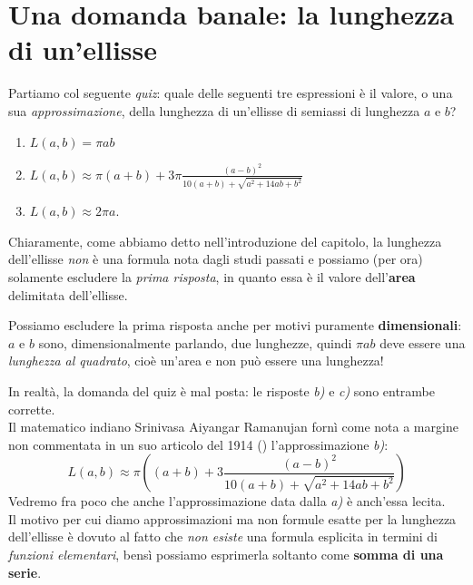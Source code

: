 \section{Una domanda banale: la lunghezza di un'ellisse}
Partiamo col seguente \textit{quiz}: quale delle seguenti tre espressioni è il valore, o una sua \textit{approssimazione}, della lunghezza di un'ellisse di semiassi di lunghezza $a$ e $b$?
\begin{enumerate}[label=\alph*)]
	\item $L\left(a,b\right)=\pi ab$
	\item $L\left(a,b\right)\approx \pi \left(a+b\right)+3\pi\frac{\left(a-b\right)^2}{10\left(a+b\right)+\sqrt{a^2+14ab+b^2}}$
	\item $L\left(a,b\right)\approx 2\pi a$.
\end{enumerate}
Chiaramente, come abbiamo detto nell'introduzione del capitolo, la lunghezza dell'ellisse \textit{non} è una formula nota dagli studi passati e possiamo (per ora) solamente escludere la \textit{prima risposta}, in quanto essa è il valore dell'\textbf{area} delimitata dell'ellisse.
\begin{observe}
	  Possiamo escludere la prima risposta anche per motivi puramente \textbf{dimensionali}: $a$ e $b$ sono, dimensionalmente parlando, due lunghezze, quindi $\pi ab$ deve essere una \textit{lunghezza al quadrato}, cioè un'area e non può essere una lunghezza!
\end{observe}
In realtà, la domanda del quiz è mal posta: le risposte \textit{b)} e \textit{c)} sono entrambe corrette.\\
Il matematico indiano Srinivasa Aiyangar Ramanujan fornì come nota a margine non commentata in un suo articolo del 1914 (\cite{ramanujan:1914piapprox}) l'approssimazione \textit{b)}:
\begin{equation*}
	L\left(a,b\right)\approx \pi\left(\left(a+b\right)+3\frac{\left(a-b\right)^2}{10\left(a+b\right)+\sqrt{a^2+14ab+b^2}}\right)
\end{equation*}
Vedremo fra poco che anche l'approssimazione data dalla \textit{a)} è anch'essa lecita.\\
Il motivo per cui diamo approssimazioni ma non formule esatte per la lunghezza dell'ellisse è dovuto al fatto che \textit{non esiste} una formula esplicita in termini di \textit{funzioni elementari}, bensì possiamo esprimerla soltanto come \textbf{somma di una serie}.
